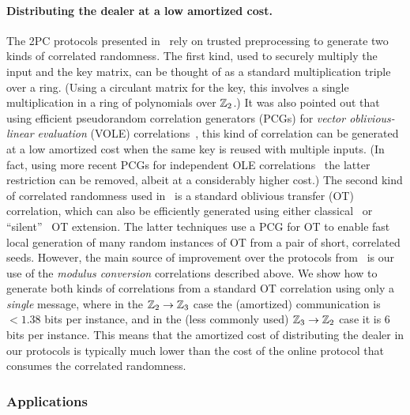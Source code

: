 \paragraph{Distributing the dealer at a low amortized cost.} The 2PC protocols presented in~\cite{boneh2018-darkmatter} rely on trusted preprocessing to generate two kinds of correlated randomness. The first kind, used to securely multiply the input and the key matrix, can be thought of as a standard multiplication triple~\cite{beaver1991-triples} over a ring. (Using a circulant matrix for the key, this involves a single multiplication in a ring of polynomials over $\mathbb{Z}_2$.)  It was also pointed out that using efficient pseudorandom correlation generators (PCGs) for {\em vector oblivious-linear evaluation} (VOLE) correlations~\cite{BCGI18,BCGIKRS19,SchoppmannGR019}, this kind of correlation can be generated at a low amortized cost when the same key is reused with multiple inputs. (In fact, using more recent PCGs for independent OLE correlations~\cite{boyle2020-lpn-pcg} the latter restriction can be removed, albeit at a considerably higher cost.)  The second kind of correlated randomness used in~\cite{boneh2018-darkmatter} is a standard oblivious transfer (OT) correlation, which can also be efficiently generated using either classical~\cite{IKNP} or ``silent''~\cite{BCGIKRS19,yang2020-ferret} OT extension. The latter techniques use a PCG for OT to enable fast local generation of many random instances of OT from a pair of short, correlated seeds.
However, the main source of improvement over the protocols from~\cite{boneh2018-darkmatter}  is our use of the {\em modulus conversion} correlations described above. We show how to generate both kinds of correlations from a standard OT correlation using only a {\em single} message, where in the $\mathbb{Z}_2 \to \mathbb{Z}_3$ case the (amortized) communication is $<1.38$ bits per instance, and in the (less commonly used) $\mathbb{Z}_3 \to \mathbb{Z}_2$ case it is $6$ bits per instance. This means that the amortized cost of distributing the dealer in our protocols is typically much lower than the cost of the online protocol that consumes the correlated randomness.


\subsubsection{Applications}


